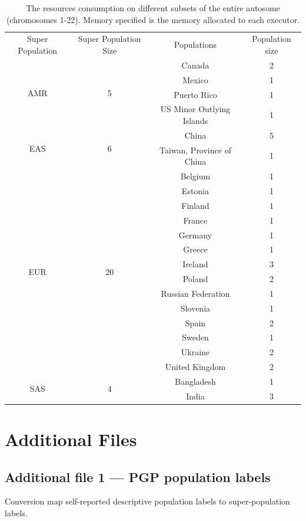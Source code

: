 \documentclass{bmcart}
\begin{document}
\begin{backmatter}
\label{pgppops}
\begin{table}[h!]
\caption{The resources consumption on different subsets of the entire autosome (chromosomes 1-22). Memory specified is the memory allocated to each executor.}
      \begin{tabular}{|c|c|c|c|}
 
Super Population		&	Super Population Size &	Populations	&	Population size \\
\multirow{4}{*}{AMR} 	&	\multirow{4}{*}{5}	&	Canada	&	2	\\
					&					&	Mexico	&	1	\\
					&					&	Puerto Rico               & 1               \\
					&					&	US Minor Outlying Islands & 1               \\
\multirow{2}{*}{EAS}		&	\multirow{2}{*}{6}	&	China                     & 5               \\
					&					&	Taiwan, Province of China & 1	\\
\multirow{14}{*}{EUR}	&	\multirow{14}{*}{20}	& Belgium				& 1	\\
					&					& Estonia				& 1	\\
					&					& Finland				& 1	\\
					&					& France				& 1	\\
					&					& Germany			& 1	\\
					&					& Greece				& 1	\\
					&					& Ireland				& 3	\\
					&					& Poland				& 2	\\
					&					& Russian Federation	& 1	\\
					&					& Slovenia			& 1	\\
					&					& Spain				& 2	\\
					&					& Sweden				& 1	\\
					&					& Ukraine				& 2	\\
					&					& United Kingdom		& 2	\\
\multirow{2}{*}{SAS}		&	\multirow{2}{*}{4}	& Bangladesh			& 1	\\
					&					& India				& 3              
      \end{tabular}
\end{table}



\section*{Additional Files}
  \subsection*{Additional file 1 --- PGP population labels}
    Conversion map self-reported descriptive population labels to super-population labels.



\end{backmatter}
\end{document}
